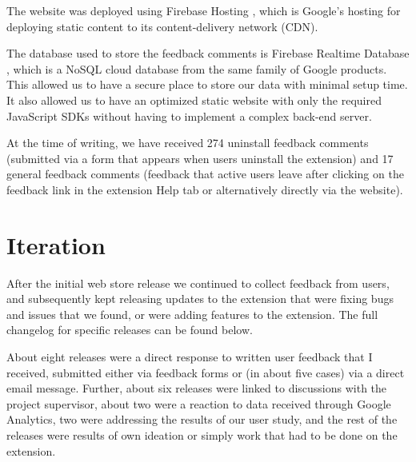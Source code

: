 \documentclass[bsc,frontabs,twoside,singlespacing,parskip,deptreport]{infthesis}
\begin{document}
The website was deployed using Firebase Hosting \cite{A8}, which is Google's hosting for deploying static content to its content-delivery network (CDN).

The database used to store the feedback comments is Firebase Realtime Database \cite{A9}, which is a NoSQL cloud database from the same family of Google products. This allowed us to have a secure place to store our data with minimal setup time. It also allowed us to have an optimized static website with only the required JavaScript SDKs without having to implement a complex back-end server.

At the time of writing, we have received 274 uninstall feedback comments (submitted via a form that appears when users uninstall the extension) and 17 general feedback comments (feedback that active users leave after clicking on the feedback link in the extension Help tab or alternatively directly via the website).

\section{Iteration}
After the initial web store release we continued to collect feedback from users, and subsequently kept releasing updates to the extension that were fixing bugs and issues that we found, or were adding features to the extension. The full changelog for specific releases can be found below.

About eight releases were a direct response to written user feedback that I received, submitted either via feedback forms or (in about five cases) via a direct email message. Further, about six releases were linked to discussions with the project supervisor, about two were a reaction to data received through Google Analytics, two were addressing the results of our user study, and the rest of the releases were results of own ideation or simply work that had to be done on the extension.
\end{document}
